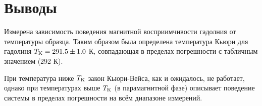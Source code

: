 \section*{Выводы}

Измерена зависимость поведения магнитной восприимчивости гадолния от температуры образца. Таким образом была определена температура Кьюри для гадолиня $T_{\textnormal{K}} = 291.5 \pm 1.0$ К, совпадающая в пределах погрешности с табличным значением (292 К).

При температура ниже $T_{\textnormal{K}}$ закон Кьюри-Вейса, как и ожидалось, не работает, однако при температурах выше $T_{\textnormal{K}}$ (в парамагнитной фазе) описывает поведение системы в пределах погрешности на всём диапазоне измерений.